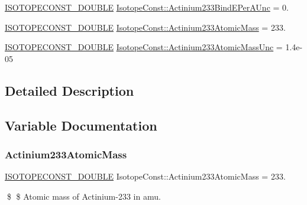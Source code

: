 \begin{DoxyCompactItemize}
\mbox{\hyperlink{group___isotope_const-_macros_ga8f45a7272ce02c0b4c65c44636ed719a}{I\+S\+O\+T\+O\+P\+E\+C\+O\+N\+S\+T\+\_\+\+D\+O\+U\+B\+LE}} \mbox{\hyperlink{group___isotope_const-_actinium-_ac233_ga86468da6f630c8aa424e798de5f11399}{Isotope\+Const\+::\+Actinium233\+Bind\+E\+Per\+A\+Unc}} = 0.
\item 
\mbox{\hyperlink{group___isotope_const-_macros_ga8f45a7272ce02c0b4c65c44636ed719a}{I\+S\+O\+T\+O\+P\+E\+C\+O\+N\+S\+T\+\_\+\+D\+O\+U\+B\+LE}} \mbox{\hyperlink{group___isotope_const-_actinium-_ac233_ga76b5043dff170d7c631be2a362748322}{Isotope\+Const\+::\+Actinium233\+Atomic\+Mass}} = 233.
\item 
\mbox{\hyperlink{group___isotope_const-_macros_ga8f45a7272ce02c0b4c65c44636ed719a}{I\+S\+O\+T\+O\+P\+E\+C\+O\+N\+S\+T\+\_\+\+D\+O\+U\+B\+LE}} \mbox{\hyperlink{group___isotope_const-_actinium-_ac233_ga84490e5c412380ed40f131eb988edbf9}{Isotope\+Const\+::\+Actinium233\+Atomic\+Mass\+Unc}} = 1.\+4e-\/05
\end{DoxyCompactItemize}


\subsection{Detailed Description}


\subsection{Variable Documentation}
\mbox{\label{group___isotope_const-_actinium-_ac233_ga76b5043dff170d7c631be2a362748322}} 
\subsubsection{\texorpdfstring{Actinium233\+Atomic\+Mass}{Actinium233AtomicMass}}
{\footnotesize\ttfamily \mbox{\hyperlink{group___isotope_const-_macros_ga8f45a7272ce02c0b4c65c44636ed719a}{I\+S\+O\+T\+O\+P\+E\+C\+O\+N\+S\+T\+\_\+\+D\+O\+U\+B\+LE}} Isotope\+Const\+::\+Actinium233\+Atomic\+Mass = 233.}

\$ \$ Atomic mass of Actinium-\/233 in amu. \mbox{\label{group___isotope_const-_actinium-_ac233_ga84490e5c412380ed40f131eb988edbf9}} 
